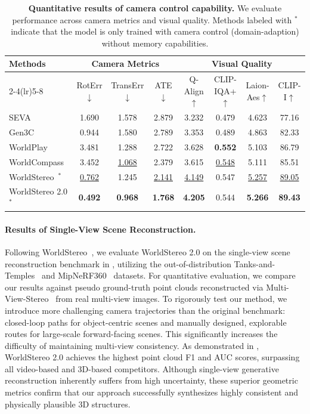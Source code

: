 \documentclass{article} %
\begin{document}
\begin{table}
\centering
\vspace{-0.15in}
\caption{\textbf{Quantitative results of camera control capability.} 
We evaluate performance across camera metrics and visual quality. Methods labeled with $^{*}$ indicate that the model is only trained with camera control (domain-adaption) without memory capabilities.
\label{tab:camera_control_exp}}
\fontsize{8.5}{9}\selectfont
\setlength{\tabcolsep}{5.5pt}
\begin{tabular}{lccccccc}
\toprule
\multirow{2}{*}{Methods} & \multicolumn{3}{c}{Camera Metrics} & \multicolumn{4}{c}{Visual Quality}\tabularnewline
\cmidrule(lr){2-4}\cmidrule(lr){5-8}
 & RotErr$\downarrow$ & TransErr$\downarrow$ & ATE$\downarrow$ & Q-Align$\uparrow$ & CLIP-IQA+$\uparrow$ & Laion-Aes$\uparrow$ & CLIP-I$\uparrow$\tabularnewline
\midrule
SEVA~\cite{zhou2025stable} & 1.690 & 1.578 & 2.879 & 3.232 & 0.479 & 4.623 & 77.16\tabularnewline
Gen3C~\cite{ren2025gen3c} & 0.944 & 1.580 & 2.789 & 3.353 & 0.489 & 4.863 & 82.33 \tabularnewline
WorldPlay~\cite{sun2025worldplay} & 3.481 & 1.288 & 2.722 & 3.628 & \textbf{0.552} & 5.103 & 86.79\tabularnewline
WorldCompass~\cite{wang2026worldcompass} & 3.452 & \underline{1.068} & 2.379 & 3.615 & \underline{0.548} & 5.111 & 85.51\tabularnewline
WorldStereo~\cite{worldstereo2026}$^{*}$ & \underline{0.762} & 1.245 & \underline{2.141} & \underline{4.149} & 0.547 & \underline{5.257} & \underline{89.05}\tabularnewline
WorldStereo 2.0$^{*}$ & \textbf{0.492} & \textbf{0.968} & \textbf{1.768} & \textbf{4.205} & 0.544 & \textbf{5.266} & \textbf{89.43}\tabularnewline
\bottomrule
\end{tabular}
\end{table}


\paragraph{Results of Single-View Scene Reconstruction.}
Following WorldStereo~\cite{worldstereo2026}, we evaluate WorldStereo 2.0 on the single-view scene reconstruction benchmark in , utilizing the out-of-distribution Tanks-and-Temples~\cite{knapitsch2017tanks} and MipNeRF360~\cite{barron2022mip} datasets.
For quantitative evaluation, we compare our results against pseudo ground-truth point clouds reconstructed via Multi-View-Stereo~\cite{cao2024mvsformer++} from real multi-view images.
To rigorously test our method, we introduce more challenging camera trajectories than the original benchmark: closed-loop paths for object-centric scenes and manually designed, explorable routes for large-scale forward-facing scenes. This significantly increases the difficulty of maintaining multi-view consistency. 
As demonstrated in , WorldStereo 2.0 achieves the highest point cloud F1 and AUC scores, surpassing all video-based and 3D-based competitors. Although single-view generative reconstruction inherently suffers from high uncertainty, these superior geometric metrics confirm that our approach successfully synthesizes highly consistent and physically plausible 3D structures.
\end{document}

